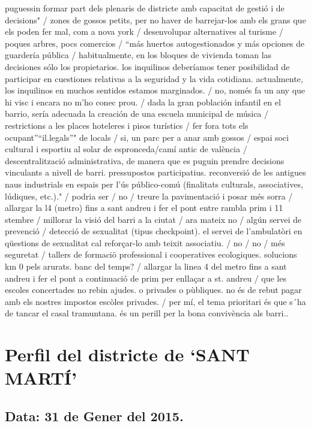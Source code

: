 \documentclass[]{article}
\begin{document}
{puguessin formar part dels plenaris de districte amb capacitat de gestió
i de decisions" / zones de gossos petits, per no haver de barrejar-los
amb els grans que els poden fer mal, com a nova york / desenvolupar
alternatives al turisme / poques arbres, pocs comercios / ``más huertos
autogestionados y más opciones de guardería pública / habitualmente, en
los bloques de vivienda toman las decisiones sólo los propietarios. los
inquilinos deberíamos tener posibilidad de participar en cuestiones
relativas a la seguridad y la vida cotidiana. actualmente, los
inquilinos en muchos sentidos estamos marginados. / no, només fa un any
que hi visc i encara no m'ho conec prou. / dada la gran población
infantil en el barrio, sería adecuada la creación de una escuela
municipal de música / restrictions a les places hoteleres i pisos
turístics / fer fora tots els ocupant''``il.legals''" de locals / si, un
parc per a anar amb gossos / espai soci cultural i esportiu al solar de
espronceda/camí antic de valència / descentralització administrativa, de
manera que es puguin prendre decisions vinculants a nivell de barri.
pressupostos participatius. reconversió de les antigues naus industrials
en espais per l'ús público-comú (finalitats culturals, associatives,
lúdiques, etc.)." / podria ser / no / treure la pavimentació i posar més
sorra / allargar la l4 (metro) fins a sant andreu i fer el pont entre
rambla prim i 11 stembre / millorar la visió del barri a la ciutat / ara
mateix no / algún servei de prevenció / detecció de sexualitat (tipus
checkpoint). el servei de l'ambulatòri en qüestions de sexualitat cal
reforçar-lo amb teixit associatiu. / no / no / més seguretat / tallers
de formaciö professional i cooperatives ecologiques. solucions km 0 pels
arurats. banc del temps? / allargar la linea 4 del metro fins a sant
andreu i fer el pont a continuació de prim per enllaçar a st. andreu /
que les escoles concertades no rebin ajudes. o privades o pùbliques. no
és de rebut pagar amb els nostres impostos escòles privades. / per mí,
el tema prioritari és que s´ha de tancar el casal tramuntana. és un
perill per la bona convivència als barri.}.

\newpage

\section{\textbf{Perfil del districte de `SANT
MARTÍ'}}\label{perfil-del-districte-de-sant-marti}

\subsection{Data: 31 de Gener del
2015.}\label{data-31-de-gener-del-2015.}
\end{document}
